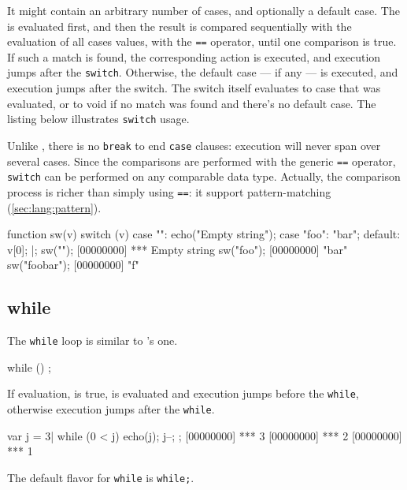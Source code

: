 It might contain an arbitrary number of cases, and optionally a default
case. The  is evaluated first, and then the result is compared
sequentially with the evaluation of all cases values, with the
\lstinline|==| operator, until one comparison is true.  If such a match is
found, the corresponding action is executed, and execution jumps after the
\lstinline|switch|. Otherwise, the default case --- if any --- is executed,
and execution jumps after the switch. The switch itself evaluates to case
that was evaluated, or to void if no match was found and there's no default
case. The listing below illustrates \lstinline|switch| usage.

Unlike \C, there is no \lstinline|break| to end \lstinline|case| clauses:
execution will never span over several cases.  Since the comparisons are
performed with the generic \lstinline|==| operator, \lstinline|switch| can
be performed on any comparable data type.  Actually, the comparison process
is richer than simply using \lstinline|==|: it support pattern-matching
(\autoref{sec:lang:pattern}).

\begin{urbiscript}
function sw(v)
{
  switch (v)
  {
    case "":
      echo("Empty string");
    case "foo":
      "bar";
    default:
      v[0];
  }
}|;
sw("");
[00000000] *** Empty string
sw("foo");
[00000000] "bar"
sw("foobar");
[00000000] "f"
\end{urbiscript}

\subsection{while}
\label{sec:lang:while}

The \lstinline|while| loop is similar to \C's one.

\begin{urbiunchecked}
while ()
  ;
\end{urbiunchecked}

If  evaluation, is true,  is evaluated and
execution jumps before the \lstinline|while|, otherwise execution
jumps after the \lstinline|while|.

\begin{urbiscript}
var j = 3|
while (0 < j)
{
  echo(j);
  j--;
};
[00000000] *** 3
[00000000] *** 2
[00000000] *** 1
\end{urbiscript}

The default flavor for \lstinline|while| is \lstinline|while;|.

